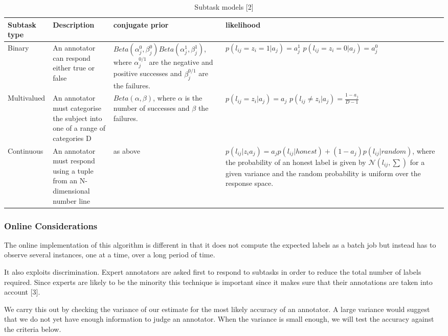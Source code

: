 \documentclass[11pt]{article}
\begin{document}
\begin{table}[htdp]
\caption{Subtask models [2]}
\begin{center}
\begin{tabular}{|p{2cm}|p{5cm}|p{4cm}|p{4cm}|}
Subtask type & Description & conjugate prior & likelihood \\
\hline
Binary & An annotator can respond either true or false & $Beta(\alpha_{j}^{0}, \beta_{j}^{0})Beta(\alpha_{j}^{1},\beta_{j}^{1})$, where $\alpha_{j}^{0/1}$ are the negative and positive successes and $\beta_{j}^{0/1}$ are the failures.& $p(l_{ij} = z_{i} = 1 | a_{j}) = a_{j}^{1}$ $p(l_{ij} = z_{i} = 0 | a_{j}) = a_{j}^{0}$\\ [2cm]

Multivalued & An annotator must categorise the subject into one of a range of categories D & $Beta(\alpha, \beta)$, where $\alpha$ is the number of successes and $\beta$ the failures.  &  $p(l_{ij} = z_{i}| a_{j}) = a_{j}$ $p(l_{ij} \ne z_{i} | a_{j}) = \frac{1 - a_{j}}{D - 1}$\\ [1cm]

Continuous & An annotator must respond using a tuple from an N-dimensional number line & as above &  $p(l_{ij} | z_{i} a_{j}) = a_{j} p(l_{ij}|honest) + (1- a_{j}) p(l_{ij}|random)$, where the probability of an honest label is given by $\mathcal{N}(l_{ij}, \sum)$ for a given variance and the random probability is uniform over the response space.\\
\end{tabular}
\end{center}
\label{models}
\end{table}

\subsubsection{Online Considerations}

The online implementation of this algorithm is different in that it does not compute the expected labels as a batch job but instead has to observe several instances, one at a time, over a long period of time.

It also exploits discrimination. Expert annotators are asked first to respond to subtasks in order to reduce the total number of labels required. Since experts are likely to be the minority this technique is important since it makes sure that their annotations are taken into account [3].

We carry this out by checking the variance of our estimate for the most likely accuracy of an annotator. A large variance would suggest that we do not yet have enough information to judge an annotator. When the variance is small enough, we will test the accuracy against the criteria below.\\
\end{document}
